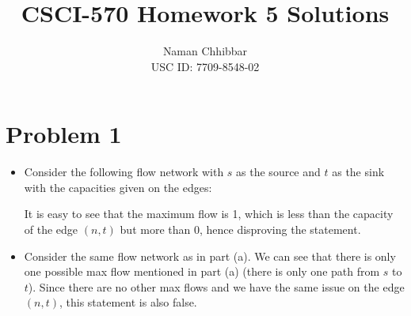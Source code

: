\documentclass{article}
\title{CSCI-570 Homework 5 Solutions}
\author{
  Naman Chhibbar \\
  USC ID: 7709-8548-02
}
\date{}
\begin{document}
\maketitle

\section{Problem 1}
  \begin{itemize}
    \item[(a)] Consider the following flow network with $s$ as the source and $t$ as the sink with the capacities given on the edges: \\
    \begin{center}
    \end{center}
    It is easy to see that the maximum flow is 1, which is less than the capacity of the edge $(n, t)$ but more than 0, hence disproving the statement.

    \item[(b)] Consider the same flow network as in part (a).
    We can see that there is only one possible max flow mentioned in part (a) (there is only one path from $s$ to $t$).
    Since there are no other max flows and we have the same issue on the edge $(n, t)$, this statement is also false.


\end{itemize}
\end{document}
